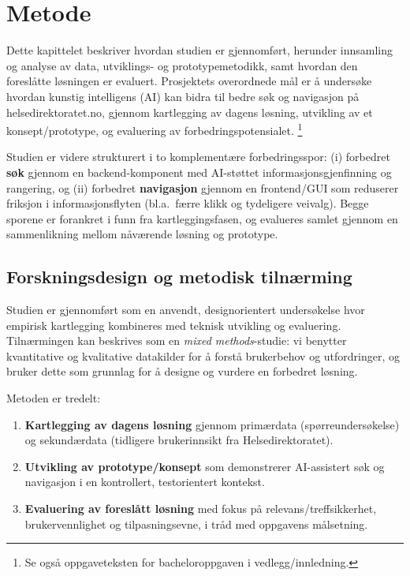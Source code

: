 \section{Metode}
\label{sec:metode}

Dette kapittelet beskriver hvordan studien er gjennomført, herunder innsamling og analyse av data, utviklings- og prototypemetodikk, samt hvordan den foreslåtte løsningen er evaluert. Prosjektets overordnede mål er å undersøke hvordan kunstig intelligens (AI) kan bidra til bedre søk og navigasjon på helsedirektoratet.no, gjennom kartlegging av dagens løsning, utvikling av et konsept/prototype, og evaluering av forbedringspotensialet. \cite{ProjectPlan}\footnote{Se også oppgaveteksten for bacheloroppgaven i vedlegg/innledning.}

Studien er videre strukturert i to komplementære forbedringsspor: (i) forbedret \textbf{søk} gjennom en backend-komponent med AI-støttet informasjonsgjenfinning og rangering, og (ii) forbedret \textbf{navigasjon} gjennom en frontend/GUI som reduserer friksjon i informasjonsflyten (bl.a.\ færre klikk og tydeligere veivalg). Begge sporene er forankret i funn fra kartleggingsfasen, og evalueres samlet gjennom en sammenlikning mellom nåværende løsning og prototype.


\subsection{Forskningsdesign og metodisk tilnærming}
\label{sec:forskningsdesign}

Studien er gjennomført som en anvendt, designorientert undersøkelse hvor empirisk kartlegging kombineres med teknisk utvikling og evaluering. Tilnærmingen kan beskrives som en \textit{mixed methods}-studie: vi benytter kvantitative og kvalitative datakilder for å forstå brukerbehov og utfordringer, og bruker dette som grunnlag for å designe og vurdere en forbedret løsning.

Metoden er tredelt:
\begin{enumerate}
    \item \textbf{Kartlegging av dagens løsning} gjennom primærdata (spørreundersøkelse) og sekundærdata (tidligere brukerinnsikt fra Helsedirektoratet).
    \item \textbf{Utvikling av prototype/konsept} som demonstrerer AI-assistert søk og navigasjon i en kontrollert, testorientert kontekst.
    \item \textbf{Evaluering av foreslått løsning} med fokus på relevans/treffsikkerhet, brukervennlighet og tilpasningsevne, i tråd med oppgavens målsetning. \cite{ProjectPlan}
\end{enumerate}

